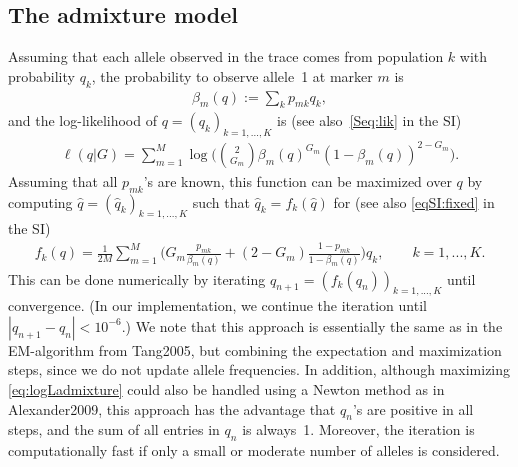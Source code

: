 \documentclass[12pt]{article}
\theoremstyle{definition}
\begin{document}
\subsection{The admixture model}
Assuming that each allele observed in the trace comes from population
$k$ with probability $q_k$, the probability to observe allele~1 at
marker $m$ is
\begin{align}
  \label{eq:beta}
  \beta_m(q) := \sum_k p_{mk} q_k,  
\end{align}
and the log-likelihood of $q = (q_k)_{k=1,...,K}$ is (see
also~\eqref{Seq:lik} in the SI)
\begin{align}\label{eq:logLadmixture}
  \ell(q|G) = \sum_{m=1}^M \log\Big(\binom{2}{G_m} \beta_m(q)^{G_m}(1-\beta_m(q))^{2-G_m}\Big).
\end{align}
Assuming that all $p_{mk}$'s are known, this function can be maximized
over $q$ by computing $\hat q = (\hat q_k)_{k=1,...,K}$ such that
$\hat q_k = f_k(\hat q)$ for (see also \eqref{eqSI:fixed} in the SI)
\begin{align}\label{eq:fixed}
  f_k(q) =
  \frac{1}{2M} \sum_{m=1}^M \Big(G_m \frac{p_{mk}}{\beta_m(q)} + (2-G_m)\frac{1-p_{mk}}{1-\beta_m(q)}\Big)q_k,
  \qquad k =1,...,K.
\end{align}
This can be done numerically by iterating
$q_{n+1} = (f_k(q_n))_{k=1,...,K}$ until convergence. (In our
implementation, we continue the iteration until
$|q_{n+1} - q_n|< 10^{-6}$.) We note that this approach is essentially
the same as in the EM-algorithm from \cite{article}{Tang2005}, but
combining the expectation and maximization steps, since we do not
update allele frequencies. In addition, although maximizing
\eqref{eq:logLadmixture} could also be handled using a Newton method
as in \cite{article}{Alexander2009}, this approach has the advantage
that $q_n$'s are positive in all steps, and the sum of all entries in
$q_n$ is always~1. Moreover, the iteration is computationally fast if
only a small or moderate number of alleles is considered.
\end{document}

